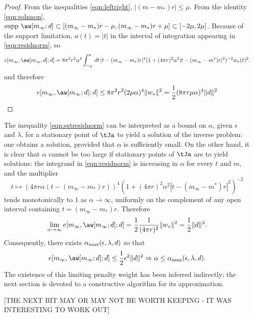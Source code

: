 \begin{proof}
From the
inequalities \ref{eqn:leftright}, $|(m-m_*)r|\le \mu$. From the
identity \ref{eqn:solnnon}, $\mbox{supp }\aw[m_{\infty};d] \subset
[(m_{\infty}-m_*)r-\mu,(m_{\infty}-m_*)r+\mu] \subset
[-2\mu,2\mu]$. Because of the support limitation, $a(t)=|t|$
in the interval of integration appearing in \ref{eqn:residnorm}, so
\[
  e[m_{\infty},\aw[m_{\infty},d];d] 
= 8 \pi^2 r^2 \alpha^4\int^{\mu}_{-\mu}\,dt\,|t-(m_{\infty}-m_*)r|^4(1+(4\pi r)^2 \alpha^2 
|t-(m_{\infty}-m^*)r|^2)^{-2}w_*(t)^2.
\]
and therefore
\begin{equation}
  \label{eqn:estresidnorm}
e[m_{\infty},\aw[m_{\infty};d];d] \le 8 \pi^2 r^2 (2\mu\alpha)^4 \|w_*\|^2 =
\frac{1}{2}(8 \pi r \mu \alpha)^4 \|d\|^2
\end{equation}
\end{proof}

The inequality \ref{eqn:estresidnorm} can be interpreted as a bound 
on $\alpha$, given $\epsilon$ and $\lambda$, for a
stationary point of $\tJa$ to yield a solution of the inverse
problem: one obtains a solution, provided that $\alpha$ is
sufficiently small. On the other hand, it is clear that $\alpha$
cannot be too large if stationary points of $\tJa$ are to yield
solutions: the integrand in \ref{eqn:residnorm} is increasing in
$\alpha$ for every $t$ and $m$, and the multiplier
\[
t \mapsto (4\pi r \alpha(t-(m_{\infty}-m_*)r))^4(1+(4\pi r)^2 \alpha^2 
|t-(m_{\infty}-m^*)r|^2)^{-2}
\]
tends monotonically to $1$ as $\alpha \rightarrow \infty$, uniformly
on the complement of any open interval containing
$t=(m_{\infty}-m_*)r$. Therefore
\begin{equation}
  \label{eqn:elimit}
  \lim_{\alpha \rightarrow \infty}e[m_{\infty},\aw[m_{\infty};d];d] =
  \frac{1}{2}\frac{1}{(4 \pi r)^2}\|w_*\|^2 = \frac{1}{2}\|d\|^2.
\end{equation}
Consequently, there exists $\alpha_{\rm max}(\epsilon,\lambda,d)$ so
that
\[
  e[m_{\infty},\aw[m_{\infty};d];d]  \le \frac{1}{2}\epsilon^2\|d\|^2
  \Rightarrow \alpha \le \alpha_{\rm max}(\epsilon,\lambda,d).
\]
The existence of this limiting penalty weight has been inferred
indirectly; the next section is devoted to a constructive algorithm
for its approximation.

[THE NEXT BIT MAY OR MAY NOT BE WORTH KEEPING - IT WAS INTERESTING TO
WORK OUT]


